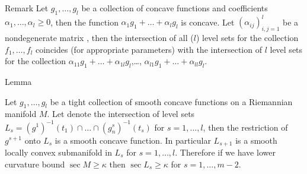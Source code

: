 \begin{thm}{Remark} \label{concavelinear}
Let 
$g_1,\dots,g_l$ be a collection of concave functions
and coefficients 
$\alpha_1,\dots,\alpha_l \ge0$, then the function
$\alpha_1g_1+\dots+\alpha_lg_l$ is concave.
Let $(\alpha_{ij})_{i,j=1}^l$ be a nondegenerate
matrix , then the intersection of all ($l$) level sets
for the collection $f_1,\dots,f_l$
coincides  
 (for appropriate parameters) with  the intersection of $l$ level sets
for the collection
 $\alpha_{11}g_1+\dots+\alpha_{1l}g_l$,\dots,  $\alpha_{l1}g_1+\dots+\alpha_{ll}g_l$.
 \end{thm}
\begin{thm}{Lemma} \label{convexinconvex}

Let 
$g_1,\dots,g_l$ be a tight collection of smooth concave functions on a Riemannian manifold $M$.
Let denote the intersection of level sets
$L_s=(g^1)^{-1}(t_1)\cap\dots\cap (g_n^{s})^{-1}(t_{s})$ for $s=1,\dots, l$,
then the restriction of
$g^{s+1}$ onto $L_s$
is a smooth concave function.  In particular
$L_{s+1}$ is a smooth 
locally convex
submanifold in $L_s$ for $s=1,\dots, l$. 
Therefore if we have lower curvature bound
$\sec M \ge\kappa$
then
$\sec L_s \ge\kappa$
for
$s=1,\dots, m-2$.
\end{thm}
